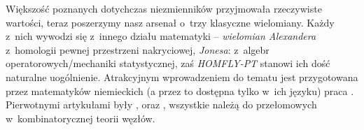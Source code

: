 Większość poznanych dotychczas niezmienników przyjmowała rzeczywiste wartości, teraz poszerzymy nasz arsenał o~trzy klasyczne wielomiany.
Każdy z~nich wywodzi się z~innego działu matematyki -- \emph{wielomian Alexandera} z~homologii pewnej przestrzeni nakryciowej, \emph{Jonesa}: z~algebr operatorowych/mechaniki statystycznej, zaś \emph{HOMFLY-PT} stanowi ich dość naturalne uogólnienie.
Atrakcyjnym wprowadzeniem do tematu jest przygotowana przez matematyków niemieckich (a przez to dostępna tylko w~ich języku) praca \cite{gellert09}.
Pierwotnymi artykułami były \cite{alexander28}, \cite{jones85} oraz \cite{homfly85}, wszystkie należą do przełomowych w~kombinatorycznej teorii węzłów.
